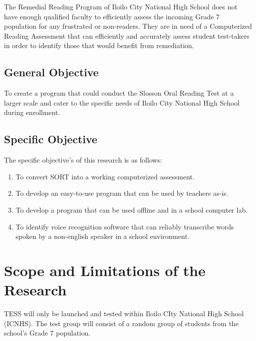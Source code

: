 The Remedial Reading Program of Iloilo City National High School does not have enough qualified faculty to efficiently assess the incoming Grade 7 population for any frustrated or non-readers. They are in need of a Computerized Reading Assessment that can efficiently and accurately assess student test-takers in order to identify those that would benefit from remediation.

\subsection{General Objective}
\label{sec:generalobjective}

To create a program that could conduct the Slosson Oral Reading Test at a larger scale and cater to the specific needs of Iloilo City National High School during enrollment.

\subsection{Specific Objective}
\label{sec:specificobjective}

The specific objective's of this research is as follows:
\begin{enumerate}
    \item To convert {SORT} into a working computerized assessment.
    \item To develop an easy-to-use program that can be used by teachers as-is.
    \item To develop a program that can be used offline and in a school computer lab.
    \item To identify voice recognition software that can reliably transcribe words spoken by a non-english speaker in a school environment.
\end{enumerate}

\section{Scope and Limitations of the Research}
\label{sec:scopelimitations}

TESS will only be launched and tested within Iloilo CIty National High School (ICNHS). The test group will consist of a random group of students from the school’s Grade 7 population.


